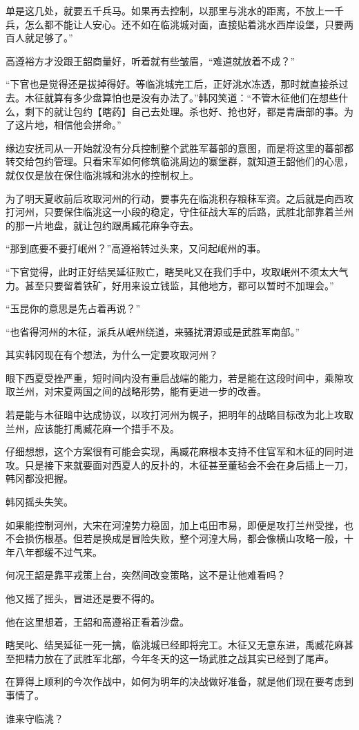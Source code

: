 单是这几处，就要五千兵马。如果再去控制，以那里与洮水的距离，不放上一千兵，怎么都不能让人安心。还不如在临洮城对面，直接贴着洮水西岸设堡，只要两百人就足够了。”

高遵裕方才没跟王韶商量好，听着就有些皱眉，“难道就放着不成？”

“下官也是觉得还是拔掉得好。等临洮城完工后，正好洮水冻透，那时就直接杀过去。木征就算有多少盘算怕也是没有办法了。”韩冈笑道：“不管木征他们在想些什么，剩下的就让包约【瞎药】自己去处理。杀也好、抢也好，都是青唐部的事。为了这片地，相信他会拼命。”

缘边安抚司从一开始就没有分兵控制整个武胜军蕃部的意图，而是将这里的蕃部都转交给包约管理。只看宋军如何修筑临洮周边的寨堡群，就知道王韶他们的心思，就仅仅是放在保住临洮城和洮水的控制权上。

为了明天夏收前后攻取河州的行动，要事先在临洮积存粮秣军资。之后就是向西攻打河州，只要保住临洮这一小段的稳定，守住征战大军的后路，武胜北部靠着兰州的那一片地盘，就让包约跟禹臧花麻争夺去。

“那到底要不要打岷州？”高遵裕转过头来，又问起岷州的事。

“下官觉得，此时正好结吴延征败亡，瞎吴叱又在我们手中，攻取岷州不须太大气力。甚至只要留着铁矿，好用来设立钱监，其他地方，都可以暂时不加理会。”

“玉昆你的意思是先占着再说？”

“也省得河州的木征，派兵从岷州绕道，来骚扰渭源或是武胜军南部。”

其实韩冈现在有个想法，为什么一定要攻取河州？

眼下西夏受挫严重，短时间内没有重启战端的能力，若是能在这段时间中，乘隙攻取兰州，对宋夏两国之间的战略形势，能有更进一步的改善。

若是能与木征暗中达成协议，以攻打河州为幌子，把明年的战略目标改为北上攻取兰州，应该能打禹臧花麻一个措手不及。

仔细想想，这个方案很有可能会实现，禹臧花麻根本支持不住官军和木征的同时进攻。只是接下来就要面对西夏人的反扑的，木征甚至董毡会不会在身后插上一刀，韩冈都没把握。

韩冈摇头失笑。

如果能控制河州，大宋在河湟势力稳固，加上屯田市易，即便是攻打兰州受挫，也不会损伤根基。但若是换成是冒险失败，整个河湟大局，都会像横山攻略一般，十年八年都缓不过气来。

何况王韶是靠平戎策上台，突然间改变策略，这不是让他难看吗？

他又摇了摇头，冒进还是要不得的。

他在这里想着，王韶和高遵裕正看着沙盘。

瞎吴叱、结吴延征一死一擒，临洮城已经即将完工。木征又无意东进，禹臧花麻甚至把精力放在了武胜军北部，今年冬天的这一场武胜之战其实已经到了尾声。

在算得上顺利的今次作战中，如何为明年的决战做好准备，就是他们现在要考虑到事情了。

谁来守临洮？

